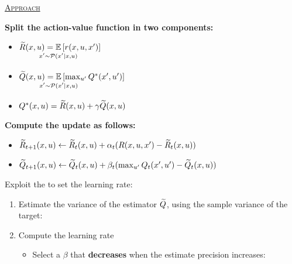 \documentclass[portrait,a0paper,fontscale=0.312]{baposter}
\newcommand{\listhead}[1] {\textsc{\underline{#1}}}
\newcommand{\compresslist}{%
\setlength{\itemsep}{1pt}%
\setlength{\parskip}{0pt}%
\setlength{\parsep}{0pt}%
}
\begin{document}
\begin{poster}
{\begin{center}
 \listhead{\Large Approach}\\
\end{center}
\begin{minipage}[t]{.4\textwidth}
  \textbf{Split the action-value function in two components:}
  \begin{itemize}\compresslist
    \renewcommand{\CancelColor}{\color{red}}
    \item $\Rtilde(x,u)=\underset{\strut\mathclap{x'\sim \Pmodel(x'|x,u)}}{\mathbb{E}}\left[ r(x,u,x')\right]$
    \item $\Qtilde(x,u)=\underset{\strut\mathclap{x'\sim \Pmodel(x'|x,u)}}{\mathbb{E}}\left[\max_{u'} Q^*(x',u')\right]$
    \item $Q^*(x,u)=\widetilde{R}(x,u)+\gamma\widetilde{Q}(x,u)$
  \end{itemize}
  \vspace{1cm}
  \textbf{Compute the update as follows:}
  \begin{itemize}
    \item $\widetilde{R}_{t+1}(x,u) \leftarrow\widetilde{R}_t(x,u)+\alpha_t(R(x,u,x')-\widetilde{R}_t(x,u))$
    \item $\widetilde{Q}_{t+1}(x,u) \leftarrow\widetilde{Q}_t(x,u)+\beta_t(\max_{u'}Q_t(x',u')-\widetilde{Q}_t(x,u))$
  \end{itemize}
\end{minipage}%
\begin{minipage}[t]{.6\textwidth}
   Exploit the  to set the learning rate:
   \begin{enumerate}
   \item Estimate the variance of the estimator $\widetilde{Q}$, using the sample variance of the target:\\
   \begin{center}
   \end{center}
   
   \item Compute the learning rate
      \begin{itemize}
	\item Select a $\beta$ that \textbf{\color{lightgreen}decreases} when the estimate precision increases:\\
	\begin{center}
	\end{center}
	

\end{itemize}
\end{enumerate}
\end{minipage}}
\end{poster}
\end{document}
